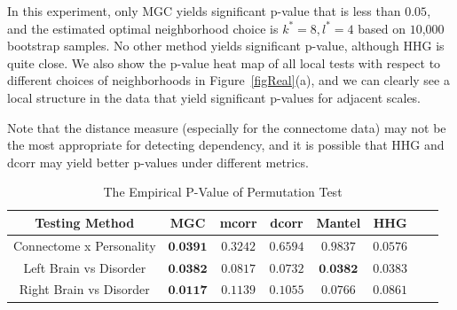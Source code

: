 \documentclass[11pt]{article}
\begin{document}
In this experiment, only MGC yields significant p-value that is less than $0.05$, and the estimated optimal neighborhood choice is $k^{*}=8, l^{*}=4$ based on $10$,$000$ bootstrap samples. No other method yields significant p-value, although HHG is quite close. We also show the p-value heat map of all local tests with respect to different choices of neighborhoods in Figure~\ref{figReal}(a), and we can clearly see a local structure in the data that yield significant p-values for adjacent scales.


Note that the distance measure (especially for the connectome data) may not be the most appropriate for detecting dependency, and it is possible that HHG and dcorr may yield better p-values under different metrics.

\begin{table}[!t]
\footnotesize
\renewcommand{\arraystretch}{0.5}
\centering
{\begin{tabular}{|c||c|c|c|c|c|c|c|}
\hline
Testing Method & MGC & mcorr & dcorr & Mantel & HHG \\
\hline
Connectome x Personality & $\textbf{0.0391}$ & $0.3242$ & $0.6594$ & $0.9837$  & $0.0576$ \\
\hline
Left Brain vs Disorder  & $\textbf{0.0382}$ & $0.0817$ & $0.0732$ & $\textbf{0.0382}$ & $0.0383$ \\
\hline
Right Brain vs Disorder & $\textbf{0.0117}$ & $0.1139$ & $0.1055$  & $0.0766$ & $0.0861$\\
\hline
\end{tabular}
\caption{The Empirical P-Value of Permutation Test}
\label{table1}
}
\end{table}
\end{document}
